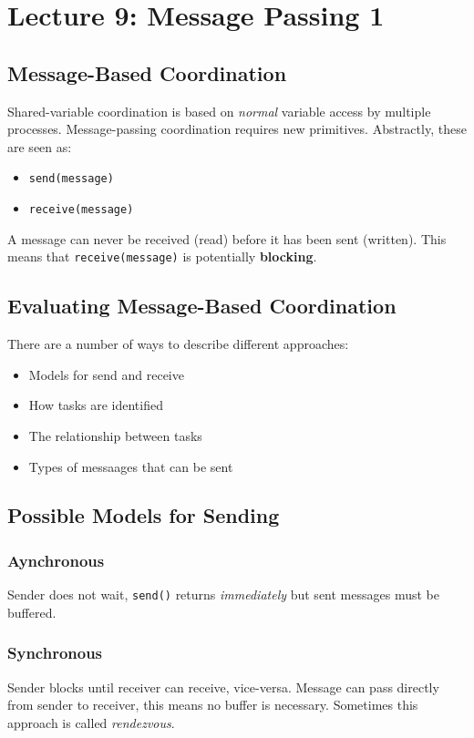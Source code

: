 \documentclass{article}
\begin{document}
\section{Lecture 9: Message Passing 1}


\subsection{Message-Based Coordination}
\label{sec:orge60e68a}
Shared-variable coordination is based on \emph{normal} variable access by multiple processes.
Message-passing coordination requires new primitives.
Abstractly, these are seen as:
\begin{itemize}
\item \texttt{send(message)}
\item \texttt{receive(message)}
\end{itemize}
A message can never be received (read) before it has been sent (written).
This means that \texttt{receive(message)} is potentially \textbf{blocking}.

\subsection{Evaluating Message-Based Coordination}
\label{sec:orgbb77c1f}
There are a number of ways to describe different approaches:
\begin{itemize}
\item Models for send and receive
\item How tasks are identified
\item The relationship between tasks
\item Types of messaages that can be sent
\end{itemize}

\subsection{Possible Models for Sending}
\label{sec:org6ff690c}
\subsubsection{Aynchronous}
\label{sec:org2340f1c}
Sender does not wait, \texttt{send()} returns \emph{immediately} but sent messages must be buffered.
\subsubsection{Synchronous}
\label{sec:org6c4db6f}
Sender blocks until receiver can receive, vice-versa.
Message can pass directly from sender to receiver, this means no buffer is necessary.
Sometimes this approach is called \emph{rendezvous}.
\end{document}
